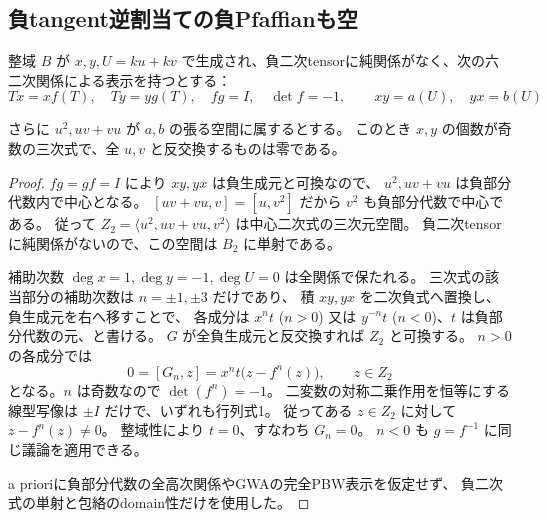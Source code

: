 \subsection{負tangent逆割当ての負Pfaffianも空}
\begin{lemma}[逆normalizerの奇次数中央化障害]
\label{lem:h3-order2-22-odd-determinant-centralizer}
整域 $B$ が $x,y,U=ku+kv$ で生成され、負二次tensorに純関係がなく、次の六二次関係による表示を持つとする：
\[
 Tx=xf(T),\quad Ty=yg(T),\quad fg=I,\quad\det f=-1,
 \qquad xy=a(U),\quad yx=b(U)
\]

さらに $u^2,uv+vu$ が $a,b$ の張る空間に属するとする。
このとき $x,y$ の個数が奇数の三次式で、全 $u,v$ と反交換するものは零である。
\end{lemma}
\begin{proof}
$fg=gf=I$ により $xy,yx$ は負生成元と可換なので、
$u^2,uv+vu$ は負部分代数内で中心となる。
$[uv+vu,v]=[u,v^2]$ だから $v^2$ も負部分代数で中心である。
従って $Z_2=\langle u^2,uv+vu,v^2\rangle$ は中心二次式の三次元空間。
負二次tensorに純関係がないので、この空間は $B_2$ に単射である。

補助次数 $\deg x=1,\deg y=-1,\deg U=0$ は全関係で保たれる。
三次式の該当部分の補助次数は $n=\pm1,\pm3$ だけであり、
積 $xy,yx$ を二次負式へ置換し、負生成元を右へ移すことで、
各成分は $x^nt$ ($n>0$) 又は $y^{-n}t$ ($n<0$)、$t$ は負部分代数の元、と書ける。
$G$ が全負生成元と反交換すれば $Z_2$ と可換する。
$n>0$ の各成分では
\[
 0=[G_n,z]=x^nt\bigl(z-f^n(z)\bigr),\qquad z\in Z_2
\]
となる。$n$ は奇数なので $\det(f^n)=-1$。
二変数の対称二乗作用を恒等にする線型写像は $\pm I$ だけで、いずれも行列式1。
従ってある $z\in Z_2$ に対して $z-f^n(z)\ne0$。
整域性により $t=0$、すなわち $G_n=0$。
$n<0$ も $g=f^{-1}$ に同じ議論を適用できる。

a prioriに負部分代数の全高次関係やGWAの完全PBW表示を仮定せず、
負二次式の単射と包絡のdomain性だけを使用した。
\end{proof}

